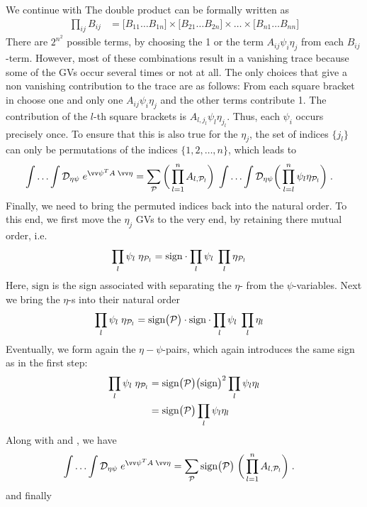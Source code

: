We continue with 
The double product can be formally written as
%
\begin{align}\label{eq:square:bracket}
\prod_{ij} B_{ij} &= \bigg[B_{11}\ldots B_{1n}\bigg]\times  \bigg[B_{21}\ldots B_{2n} \bigg]\times \ldots \times 
\bigg[ B_{n1}\ldots B_{nn}\bigg]
\end{align}
%
There are $2^{n^{2}}$ possible terms, by choosing  the 1 or the term $A_{ij}\psi_{i}\eta_{j}$ from each $B_{ij}$-term.
However, most of these combinations result in a vanishing trace because some of the GVs occur several times or not at all. The only choices that give a non vanishing contribution to the trace are as follows: From 
each  square bracket in   choose one and only one $A_{i j} \psi_{i}\eta_{j}$ and the other terms contribute  1. 
The contribution of the $l$-th square brackets is
$A_{l,j_{l}} \psi_{l}\eta_{j_{l}}$.
Thus, each $\psi_{i}$ occurs precisely once. To ensure that this is also true for the $\eta_{j}$,
the set of indices  $\{j_{l}\}$ can only be permutations of the indices $\{1,2,\ldots,n\}$, which 
leads to
%
\begin{align}\label{eq:gaussian:B}
\int\ldots\int \Dep\; e^{\vv\psi^{T} A \;\vv \eta} &=
\sum_{\cP } \bigg(\prod_{l=1}^{n} A_{l,\cP _{l}}\bigg)\;\int\ldots\int \Dep 
\bigg( \prod_{l=l}^{n}\psi_{l} \eta_{\cP _{l}}  \bigg)\;.
\end{align}
%
Finally, we need to bring the permuted indices back into the natural order. To this end, we first
move the $\eta_{j}$ GVs to the very end, by retaining there mutual order, i.e.
\begin{align*}
\prod_{l}\psi_{l} \;\eta_{{\cal P} _{l}}&= 
\text{sign} \cdot \prod_{l}\psi_{l} \;\prod_{l}\eta_{{\cal P} _{l}}
\end{align*}
%
Here, $\text{sign}$ is the sign associated with separating the $\eta$- from the $\psi$-variables.
Next we bring the $\eta$-s into their natural order
\begin{align*}
\prod_{l}\psi_{l} \;\eta_{{\cal P} _{l}}&= \text{sign} \big( {\cal P}  \big)\cdot
\text{sign} \cdot \prod_{l}\psi_{l} \;\prod_{l}\eta_{l}
\end{align*}
%
Eventually, we form again the $\eta-\psi$-pairs, which again introduces the same sign as in the first step:
%
\begin{align*}
\prod_{l}\psi_{l} \;\eta_{{\cal P} _{l}}&= \text{sign}\big( {\cal P}  \big)
\big(\text{sign}\big)^{2} \prod_{l}\psi_{l} \eta_{l}\\
&=\text{sign}\big( {\cal P}  \big)\prod_{l}\psi_{l} \eta_{l}
\end{align*}
%
Along with  and , we have
%
\begin{align*}
\int\ldots\int \Dep\; e^{\vv\psi^{T} A \;\vv \eta} &=
\sum_{\cP }\text{sign}\big( \cP  \big)\; \bigg(\prod_{l=1}^{n} A_{l,\cP _{l}}\bigg)\;.
\end{align*}
%
and finally
%

